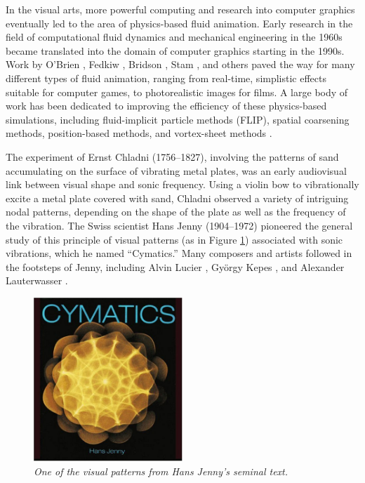 In the visual arts, more powerful computing and research into computer graphics eventually led to the area of physics-based fluid animation. Early research in the field of computational fluid dynamics and mechanical engineering in the 1960s \cite{harlow1965numerical, gentry1966eulerian, hess1967calculation} became translated into the domain of computer graphics starting in the 1990s. Work by O'Brien \cite{o1995dynamic}, Fedkiw \cite{fedkiw1999non}, Bridson \cite{bridson2007curl}, Stam \cite{stam2003real}, and others paved the way for many different types of fluid animation, ranging from real-time, simplistic effects suitable for computer games, to photorealistic images for films. A large body of work has been dedicated to improving the efficiency of these physics-based simulations, including
fluid-implicit particle methods (FLIP), spatial coarsening methods, position-based methods, and vortex-sheet methods \cite{brackbill1988flip, Ando:2013:HAL, Macklin:2014, Pfa12}.

The experiment of Ernst Chladni (1756--1827), involving the patterns of sand accumulating on the surface of vibrating metal plates, was an early audiovisual link between visual shape and sonic frequency. Using a violin bow to vibrationally excite a metal plate covered with sand, Chladni observed a variety of intriguing nodal patterns, depending on the shape of the plate as well as the frequency of the vibration. The Swiss scientist Hans Jenny (1904--1972) pioneered the general study of this principle of visual patterns (as in Figure \ref{fig:cymatics}) associated with sonic vibrations, which he named ``Cymatics.'' Many composers and artists followed in the footsteps of Jenny, including Alvin Lucier \cite{lucier1998origins}, Gy{\"o}rgy Kepes \cite{kepes1958new}, and Alexander Lauterwasser \cite{lauterwasser2003wasser}. 

\begin{figure}
\centering
\includegraphics[width=0.5\textwidth]{chap1/figures/cymatics.jpg}
\caption{\em One of the visual patterns from Hans Jenny's seminal text.}
\label{fig:cymatics}
\end{figure}

